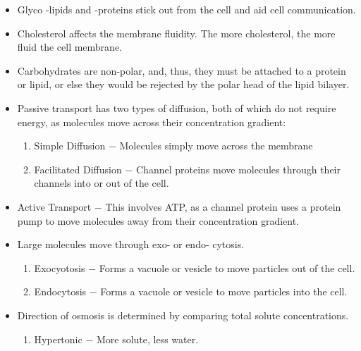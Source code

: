 \documentclass[12pt]{article}
\begin{document}
\begin{itemize}
  \item Glyco -lipids and -proteins stick out from the cell and aid cell communication.

  \item Cholesterol affects the membrane fluidity. The more cholesterol, the more fluid the cell membrane.

  \item Carbohydrates are non-polar, and, thus, they must be attached to a protein or lipid, or else they would be rejected by the polar head of the lipid bilayer.

  \item Passive transport has two types of diffusion, both of which do not require energy, as molecules move across their concentration gradient:

    \begin{enumerate}

      \item Simple Diffusion $-$ Molecules simply move across the membrane

      \item Facilitated Diffusion $-$ Channel proteins move molecules through their channels into or out of the cell.

    \end{enumerate}

  \item Active Transport $-$ This involves ATP, as a channel protein uses a protein pump to move molecules away from their concentration gradient.

  \item Large molecules move through exo- or endo- cytosis.

    \begin{enumerate}

      \item Exocyotosis $-$ Forms a vacuole or vesicle to move particles out of the cell.

      \item Endocytosis $-$ Forms a vacuole or vesicle to move particles into the cell.

    \end{enumerate}

  \item  Direction of osmosis is determined by comparing total solute concentrations.

    \begin{enumerate}

      \item Hypertonic $-$ More solute, less water.


\end{enumerate}
\end{itemize}
\end{document}
